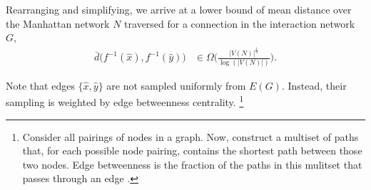 Rearranging and simplifying, we arrive at a lower bound of mean distance over the Manhattan network $N$ traversed for a connection in the interaction network $G$,
\begin{align*}
\bar{d}\Big(f^{-1}(\hat{x}), f^{-1}(\hat{y})\Big)
&\in
\Omega \Big(
  \frac{|V(N)|^{\frac{1}{3}}}{\log(|V(N)|)}
\Big).
\end{align*}

Note that edges $\{\hat{x},\hat{y}\}$ are not sampled uniformly from $E(G)$.
Instead, their sampling is weighted by edge betweenness centrality.
\footnote{
Consider all pairings of nodes in a graph.
Now, construct a multiset of paths that, for each possible node pairing, contains the shortest path between those two nodes.
Edge betweenness is the fraction of the paths in this mulitset that passes through an edge \citep{Lu2013}.
}

